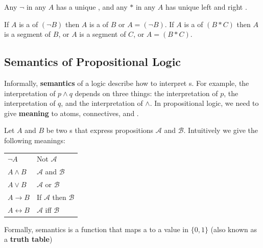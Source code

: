 \documentclass[english, 11pt]{article}
\begin{document}
  \begin{thrm}
    \label{uniquescope}
    Any $\neg$ in any $A$ has a unique , and any $*$ in any $A$ has unique left and right .
  \end{thrm}

  \begin{thrm}
    If $A$ is a  of $(\neg B)$ then $A$ is a  of $B$ or $A = (\neg B)$. If $A$ is a  of $(B * C)$ then $A$ is a segment of $B$, or $A$ is a segment of $C$, or $A = (B*C)$.
  \end{thrm}

  \subsection[Semantics]{Semantics of Propositional Logic}

  \begin{defn}[semantics]\label{semantics}
    Informally, \textbf{semantics} of a logic describe how to interpret s. For example, the interpretation of  $p \land q$ depends on three things: the interpretation of $p$, the interpretation of $q$, and the interpretation of $\land$. In propositional logic, we need to give \textbf{meaning} to atoms, connectives, and .
  \end{defn}

  Let $A$ and $B$ be two s that express propositions $\mathcal{A}$ and $\mathcal{B}$. Intuitively we give the following meanings:
  \begin{center}
    \begin{tabular}{l l}
      $\neg A$ & Not $\mathcal{A}$ \\
      $A \land B$ & $\mathcal{A}$ and $\mathcal{B}$ \\
      $A \lor B$ &  $\mathcal{A}$ or $\mathcal{B}$ \\
      $A \rightarrow B$ &  If $\mathcal{A}$ then $\mathcal{B}$  \\
      $A \leftrightarrow B$ &  $\mathcal{A}$ iff $\mathcal{B}$  \\
    \end{tabular}
  \end{center}

  \begin{defn}[semantics]
    \label{semantics}
    Formally, semantics is a function that maps a  to a value in $\{ 0,1\}$ (also known as a \textbf{truth table})
  \end{defn}
\end{document}
